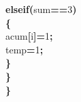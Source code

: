 \documentclass[a4paper, 11pt]{article}
\newcommand\SPC{\hspace*{0.6em}}
\newcommand{\CppAIdentifier}[1]{#1}
\newcommand{\CppANumber}[1]{\textcolor[rgb]{0.5,0,0.5}{#1}}
\newcommand{\CppAReservedWord}[1]{\textbf{#1}}
\newcommand{\CppASpace}[1]{\colorbox[rgb]{1,1,1}{#1}}
\newcommand{\CppASymbol}[1]{\textbf{\textcolor[rgb]{1,0,0}{#1}}}
\begin{document}
\begin{ttfamily}
\CppAReservedWord{else}\CppASpace{\SPC }\CppAReservedWord{if}\CppASymbol{(}\CppAIdentifier{sum}\CppASymbol{==}\CppANumber{3}\CppASymbol{)}\\
\CppASymbol{\{}\\
\CppAIdentifier{acum}\CppASymbol{[}\CppAIdentifier{i}\CppASymbol{]}\CppASymbol{=}\CppANumber{1}\CppASymbol{;}\\
\CppAIdentifier{temp}\CppASymbol{=}\CppANumber{1}\CppASymbol{;}\\
\CppASymbol{\}}\\
\CppASymbol{\}}\\
\CppASymbol{\}}\\
\\

\end{ttfamily}
\end{document}
